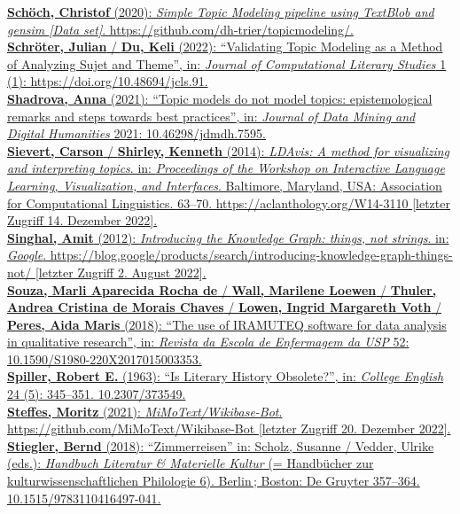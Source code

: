 \documentclass[
  12pt,
  letterpaper,
  DIV=11,
  numbers=noendperiod]{scrreprt}
\begin{document}
\href{https://www.zotero.org/google-docs/?fqBRoB}{\textbf{Schöch,
Christof} (2020): \emph{Simple Topic Modeling pipeline using TextBlob
and gensim {[}Data set{]}}.
https://github.com/dh-trier/topicmodeling/.}\\
\href{https://www.zotero.org/google-docs/?fqBRoB}{\textbf{Schröter,
Julian} / \textbf{Du, Keli} (2022): ``Validating Topic Modeling as a
Method of Analyzing Sujet and Theme'', in: \emph{Journal of
Computational Literary Studies} 1 (1):
https://doi.org/10.48694/jcls.91.}\\
\href{https://www.zotero.org/google-docs/?fqBRoB}{\textbf{Shadrova,
Anna} (2021): ``Topic models do not model topics: epistemological
remarks and steps towards best practices'', in: \emph{Journal of Data
Mining and Digital Humanities} 2021: 10.46298/jdmdh.7595.}\\
\href{https://www.zotero.org/google-docs/?fqBRoB}{\textbf{Sievert,
Carson} / \textbf{Shirley, Kenneth} (2014): \emph{LDAvis: A method for
visualizing and interpreting topics}. in: \emph{Proceedings of the
Workshop on Interactive Language Learning, Visualization, and
Interfaces}. Baltimore, Maryland, USA: Association for Computational
Linguistics. 63--70. https://aclanthology.org/W14-3110 {[}letzter
Zugriff 14. Dezember 2022{]}.}\\
\href{https://www.zotero.org/google-docs/?fqBRoB}{\textbf{Singhal, Amit}
(2012): \emph{Introducing the Knowledge Graph: things, not strings}. in:
\emph{Google}.
https://blog.google/products/search/introducing-knowledge-graph-things-not/
{[}letzter Zugriff 2. August 2022{]}.}\\
\href{https://www.zotero.org/google-docs/?fqBRoB}{\textbf{Souza, Marli
Aparecida Rocha de} / \textbf{Wall, Marilene Loewen} / \textbf{Thuler,
Andrea Cristina de Morais Chaves} / \textbf{Lowen, Ingrid Margareth
Voth} / \textbf{Peres, Aida Maris} (2018): ``The use of IRAMUTEQ
software for data analysis in qualitative research'', in: \emph{Revista
da Escola de Enfermagem da USP} 52: 10.1590/S1980-220X2017015003353.}\\
\href{https://www.zotero.org/google-docs/?fqBRoB}{\textbf{Spiller,
Robert E.} (1963): ``Is Literary History Obsolete?'', in: \emph{College
English} 24 (5): 345--351. 10.2307/373549.}\\
\href{https://www.zotero.org/google-docs/?fqBRoB}{\textbf{Steffes,
Moritz} (2021): \emph{MiMoText/Wikibase-Bot}.
https://github.com/MiMoText/Wikibase-Bot {[}letzter Zugriff 20. Dezember
2022{]}.}\\
\href{https://www.zotero.org/google-docs/?fqBRoB}{\textbf{Stiegler,
Bernd} (2018): ``Zimmerreisen'' in: Scholz, Susanne / Vedder, Ulrike
(eds.): \emph{Handbuch Literatur \& Materielle Kultur} (= Handbücher zur
kulturwissenschaftlichen Philologie 6). Berlin\,; Boston: De Gruyter
357--364. 10.1515/9783110416497-041.}\\
\end{document}
